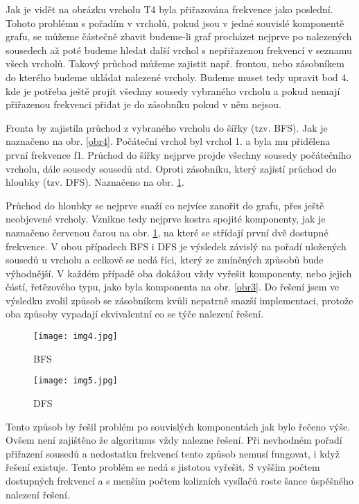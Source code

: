 \documentclass[12pt]{report}
\begin{document}
Jak je vidět na obrázku vrcholu T4 byla přiřazována frekvence jako poslední. Tohoto problému s pořadím v vrcholů, pokud jsou v jedné souvislé komponentě grafu, se můžeme částečně zbavit budeme-li graf procházet nejprve po nalezených sousedech až poté budeme hledat další vrchol s nepřiřazenou frekvencí v seznamu všech vrcholů. Takový průchod můžeme zajistit např. frontou, nebo zásobníkem do kterého budeme ukládat nalezené vrcholy. Budeme muset tedy upravit bod 4. kde je potřeba ještě projít všechny sousedy vybraného vrcholu a pokud nemají přiřazenou frekvenci přidat je do zásobníku pokud v něm nejsou.

Fronta by zajistila průchod z vybraného vrcholu do šířky (tzv. BFS). Jak je naznačeno na obr. \ref{obr4}. Počáteční vrchol byl vrchol 1. a byla mu přidělena první frekvence f1. Průchod do šířky nejprve projde všechny sousedy počátečního vrcholu, dále sousedy sousedů atd. Oproti zásobníku, který zajistí průchod do hloubky (tzv. DFS). Naznačeno na obr. \ref{obr5}. 

Průchod do hloubky se nejprve snaží co nejvíce zanořit do grafu, přes ještě neobjevené vrcholy. Vznikne tedy nejprve kostra spojité komponenty, jak je naznačeno červenou čarou na obr. \ref{obr5}, na které se střídají první dvě dostupné frekvence. V obou případech BFS i DFS je výsledek závislý na pořadí uložených sousedů u vrcholu a celkově se nedá říci, který ze zmíněných způsobů bude výhodnější. V každém případě oba dokážou vždy vyřešit komponenty, nebo jejich částí, řetězového typu, jako byla komponenta na obr. \ref{obr3}. Do řešení jsem ve výsledku zvolil způsob se zásobníkem kvůli nepatrně snazší implementaci, protože oba způsoby vypadají ekvivalentní co se týče nalezení řešení.

\begin{figure}[ht]
\begin{minipage}{6cm}
\texttt{[image: img4.jpg]}
\caption{BFS}
\label{obr4}
\end{minipage}
\hspace{\fill}
\begin{minipage}{6cm}
\texttt{[image: img5.jpg]}
\caption{DFS}
\label{obr5}
\end{minipage}
\end{figure}

Tento způsob by řešil problém po souvislých komponentách jak bylo řečeno výše. Ovšem není zajištěno že algoritmus vždy nalezne řešení. Při nevhodném pořadí přiřazení sousedů a nedostatku frekvencí tento způsob nemusí fungovat, i když řešení existuje. Tento problém se nedá s jistotou vyřešit. S vyšším počtem dostupných frekvencí a s menším počtem kolizních vysílačů roste šance úspěšného nalezení řešení.
\end{document}
